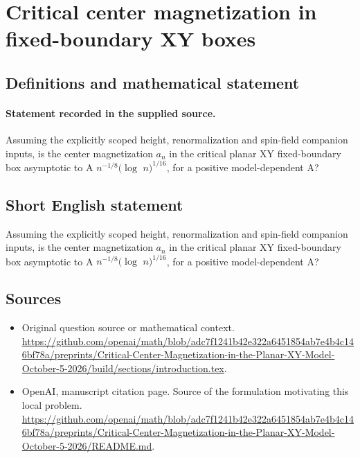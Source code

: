 \documentclass[11pt]{article}
\begin{document}
\section*{Critical center magnetization in fixed-boundary XY boxes}\label{statement}
\subsection{Definitions and mathematical statement}
\paragraph{Statement recorded in the supplied source.}
Assuming the explicitly scoped height, renormalization and spin-field companion inputs, is the center magnetization $a_n$ in the critical planar XY fixed-boundary box asymptotic to A $n^{-1/8}(\log $ $n)^{1/16}$, for a positive model-dependent A?
\subsection{Short English statement}
Assuming the explicitly scoped height, renormalization and spin-field companion inputs, is the center magnetization $a_n$ in the critical planar XY fixed-boundary box asymptotic to A $n^{-1/8}(\log $ $n)^{1/16}$, for a positive model-dependent A?
\subsection{Sources}
\begin{itemize}
\item[S1] Original question source or mathematical context.
\url{https://github.com/openai/math/blob/adc7f1241b42e322a6451854ab7e4b4c146bf78a/preprints/Critical-Center-Magnetization-in-the-Planar-XY-Model-October-5-2026/build/sections/introduction.tex}.
\item[S2] OpenAI, manuscript citation page. Source of the formulation motivating this local problem.
\url{https://github.com/openai/math/blob/adc7f1241b42e322a6451854ab7e4b4c146bf78a/preprints/Critical-Center-Magnetization-in-the-Planar-XY-Model-October-5-2026/README.md}.
\end{itemize}
\end{document}
